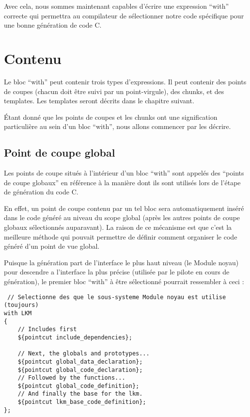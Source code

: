 \documentclass[french]{rtxreport}
\begin{document}
Avec cela, nous sommes maintenant capables d'écrire une expression “with”
correcte qui permettra au compilateur de sélectionner notre code spécifique
pour une bonne génération de code C.

\section{Contenu}

Le bloc ``with'' peut contenir trois types d'expressions. Il peut contenir des
points de coupes (chacun doit être suivi par un point-virgule), des chunks, et
des templates. Les templates seront décrits dans le chapitre suivant.

Étant donné que les points de coupes et les chunks ont une signification
particulière au sein d'un bloc ``with'', nous allons commencer par les décrire.

\subsection{Point de coupe global}

Les points de coupe situés à l'intérieur d'un bloc ``with'' sont appelés des
``points de coupe globaux'' en référence à la manière dont ils sont utilisés
lors de l'étape de génération du code C.

En effet, un point de coupe contenu par un tel bloc sera automatiquement inséré
dans le code généré au niveau du scope global (après les autres points de coupe
globaux sélectionnés auparavant). La raison de ce mécanisme est que c'est la
meilleure méthode qui pouvait permettre de définir comment organiser le code
généré d'un point de vue global.

Puisque la génération part de l'interface le plus haut niveau (le Module
noyau) pour descendre a l'interface la plus précise (utilisée par le pilote en
cours de génération), le premier bloc ``with'' à être sélectionné pourrait
ressembler à ceci :

\begin{lstlisting}
 // Selectionne des que le sous-systeme Module noyau est utilise (toujours)
with LKM
{
    // Includes first
    ${pointcut include_dependencies};

    // Next, the globals and prototypes...
    ${pointcut global_data_declaration};
    ${pointcut global_code_declaration};
    // Followed by the functions...
    ${pointcut global_code_definition};
    // And finally the base for the lkm.
    ${pointcut lkm_base_code_definition};
};
\end{lstlisting}
\end{document}
